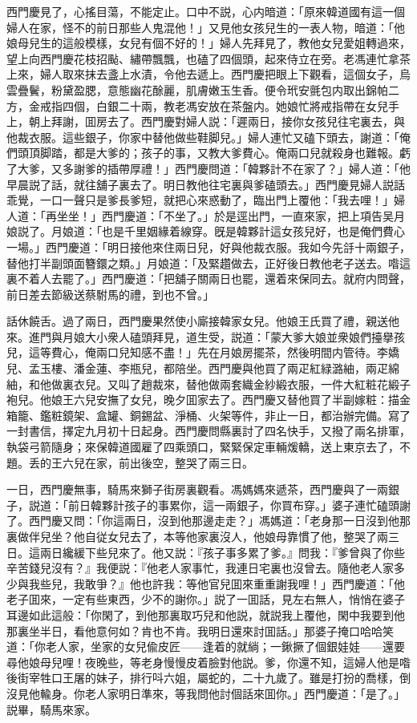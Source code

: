 西門慶見了，心搖目蕩，不能定止。口中不説，心内暗道：「原來韓道國有這一個婦人在家，怪不的前日那些人鬼混他！」又見他女孩兒生的一表人物，暗道：「他娘母兒生的這般模樣，女兒有個不好的！」婦人先拜見了，教他女兒愛姐轉過來，望上向西門慶花枝招颭、繡帶飄飄，也磕了四個頭，起來侍立在旁。老馮連忙拿茶上來，婦人取來抹去盞上水漬，令他去遞上。西門慶把眼上下觀看，這個女子，烏雲疊鬢，粉黛盈腮，意態幽花酴麗，肌膚嫩玉生香。便令玳安氈包内取出錦帕二方，金戒指四個，白銀二十兩，教老馮安放在茶盤内。她娘忙將戒指帶在女兒手上，朝上拜謝，囬房去了。西門慶對婦人説：「遲兩日，接你女孩兒往宅裏去，與他裁衣服。這些銀子，你家中替他做些鞋脚兒。」婦人連忙又磕下頭去，謝道：「俺們頭頂脚踏，都是大爹的；孩子的事，又教大爹費心。俺兩口兒就殺身也難報。虧了大爹，又多謝爹的插帶厚禮！」西門慶問道：「韓夥計不在家了？」婦人道：「他早晨説了話，就往舖子裏去了。明日教他往宅裏與爹磕頭去。」西門慶見婦人説話乖覺，一口一聲只是爹長爹短，就把心來惑動了，臨出門上覆他：「我去哩！」婦人道：「再坐坐！」西門慶道：「不坐了。」於是逕出門，一直來家，把上項告吴月娘説了。月娘道：「也是千里姻緣着線穿。旣是韓夥計這女孩兒好，也是俺們費心一場。」西門慶道：「明日接他來住兩日兒，好與他裁衣服。我如今先㧱十兩銀子，替他打半副頭面簪鐶之類。」月娘道：「及緊趲做去，正好後日教他老子送去。喒這裏不着人去罷了。」西門慶道：「把舖子關兩日也罷，還着來保同去。就府内問聲，前日差去節級送蔡駙馬的禮，到也不曾。」

話休饒舌。過了兩日，西門慶果然使小廝接韓家女兒。他娘王氏買了禮，親送他來。進門與月娘大小衆人磕頭拜見，道生受，説道：「蒙大爹大娘並衆娘們擡擧孩兒，這等費心，俺兩口兒知感不盡！」先在月娘房擺茶，然後明間内管待。李嬌兒、孟玉樓、潘金蓮、李瓶兒，都陪坐。西門慶與他買了兩疋紅緑潞紬，兩疋綿紬，和他做裏衣兒。又叫了趙裁來，替他做兩套織金紗緞衣服，一件大紅粧花緞子袍兒。他娘王六兒安撫了女兒，晚夕囬家去了。西門慶又替他買了半副嫁粧：描金箱籠、鑑粧鏡架、盒罐、銅錫盆、淨桶、火架等件，非止一日，都治辦完備。寫了一封書信，擇定九月初十日起身。西門慶問縣裏討了四名快手，又撥了兩名排軍，執袋弓箭隨身；來保韓道國雇了四乘頭口，緊緊保定車輛煖轎，送上東京去了，不題。丢的王六兒在家，前出後空，整哭了兩三日。

一日，西門慶無事，騎馬來獅子街房裏觀看。馮媽媽來遞茶，西門慶與了一兩銀子，説道：「前日韓夥計孩子的事累你，這一兩銀子，你買布穿。」婆子連忙磕頭謝了。西門慶又問：「你這兩日，沒到他那邊走走？」馮媽道：「老身那一日沒到他那裏做伴兒坐？他自従女兒去了，本等他家裏沒人，他娘母靠慣了他，整哭了兩三日。這兩日纔緩下些兒來了。他又説：『孩子事多累了爹。』問我：『爹曾與了你些辛苦錢兒沒有？』我便説：『他老人家事忙，我連日宅裏也沒曾去。隨他老人家多少與我些兒，我敢爭？』他也許我：等他官兒囬來重重謝我哩！」西門慶道：「他老子囬來，一定有些東西，少不的謝你。」説了一囬話，見左右無人，悄悄在婆子耳邊如此這般：「你閑了，到他那裏取巧兒和他説，就説我上覆他，閑中我要到他那裏坐半日，看他意何如？肯也不肯。我明日還來討囬話。」那婆子掩口哈哈笑道：「你老人家，坐家的女兒偸皮匠——逢着的就緔；一鍬撅了個銀娃娃——還要尋他娘母兒哩！夜晚些，等老身慢慢皮着臉對他説。爹，你還不知，這婦人他是喒後街宰牲口王屠的妹子，排行呌六姐，屬蛇的，二十九歲了。雖是打扮的喬樣，倒沒見他輸身。你老人家明日準來，等我問他討個話來囬你。」西門慶道：「是了。」説畢，騎馬來家。

